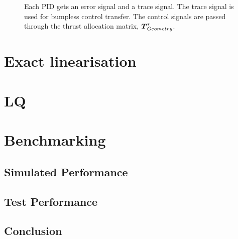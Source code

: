 \begin{figure}
    
    \caption{Each PID gets an error signal and a trace signal. The trace signal is used for bumpless control transfer. The control signals are passed through the thrust allocation matrix, $\thrusterGeometryOnes[*]$.} 
    \label{fig:dec_pid}
\end{figure}

\section{Exact linearisation}

\section{LQ}


\section{Benchmarking}
\subsection{Simulated Performance}
\subsection{Test Performance}
\subsection{Conclusion}